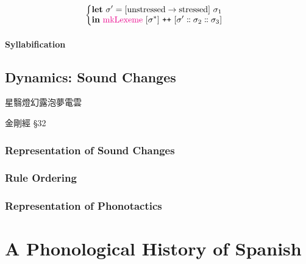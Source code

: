 \documentclass{report}[12pt]
\begin{document}
\begin{align*}
\begin{cases}
\begin{aligned}
                                                                                     & \textbf{let}\ \sigma' = [\text{unstressed} \rightarrow \text{stressed}]\ \sigma_1 \\
                                                                                     & \textbf{in}\ \text{\textcolor{magenta}{mkLexeme}}\ [\sigma^{*}]\ \texttt{++}\ [\sigma' \dblcolon \sigma_2 \dblcolon \sigma_3] \\
                                                                                   \end{aligned} \\
                                                      \end{cases}
\end{align*}

\subsection{Syllabification}

\chapter{Dynamics: Sound Changes}

\epigraph{星翳燈幻露泡夢電雲\footnotemark}{金剛經 \S32}

\section{Representation of Sound Changes}

\section{Rule Ordering}

\section{Representation of Phonotactics}

\part*{A Phonological History of Spanish}
\end{document}

